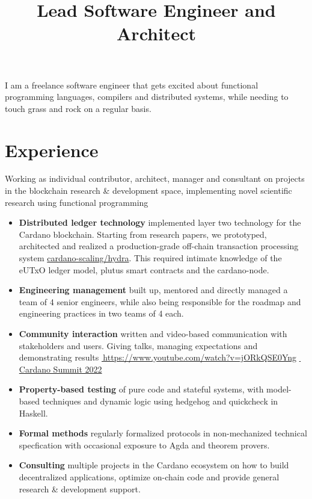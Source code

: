 \documentclass[11pt,a4paper,sans]{moderncv}
\title{Lead Software Engineer and Architect}
\renewcommand*{\link}[2][]{%
  \ifthenelse{\equal{#1}{}}%
    {\href{#2}{\color{link}\faExternalLink*\,#2}}%
    {\href{#2}{\color{link}\faExternalLink*\,#1}}}
\newcommand*{\githublink}[1]{\href{https://github.com/#1}{\color{link}\githubsocialsymbol#1}}%
\begin{document}
\makecvtitle

I am a freelance software engineer that gets excited about functional programming languages, compilers and distributed systems, while needing to touch grass and rock on a regular basis.

\section{Experience}

Working as individual contributor, architect, manager and consultant on projects
in the blockchain research \& development space, implementing novel scientific
research using functional programming

\vspace{0.5em}
\begin{itemize}
\setlength\itemsep{0.5em}
  \item \textbf{Distributed ledger technology} implemented layer two technology
        for the Cardano blockchain. Starting from research papers, we
        prototyped, architected and realized a production-grade off-chain
        transaction processing system \githublink{cardano-scaling/hydra}. This
        required intimate knowledge of the eUTxO ledger model, plutus smart
        contracts and the cardano-node.
  \item \textbf{Engineering management} built up, mentored and directly managed
        a team of 4 senior engineers, while also being responsible for the
        roadmap and engineering practices in two teams of 4 each.
  \item \textbf{Community interaction} written and video-based communication
        with stakeholders and users. Giving talks, managing expectations and
        demonstrating results \link[Cardano Summit
        2022]{https://www.youtube.com/watch?v=jORkQSE0Yng}
  \item \textbf{Property-based testing} of pure code and stateful systems, with
        model-based techniques and dynamic logic using hedgehog and quickcheck
        in Haskell.
  \item \textbf{Formal methods} regularly formalized protocols in non-mechanized
        technical specfication with occasional exposure to Agda and theorem
        provers.
  \item \textbf{Consulting} multiple projects in the Cardano ecosystem on how to
        build decentralized applications, optimize on-chain code and provide
        general research \& development support.
\end{itemize}
\vspace{1em}
\end{document}
